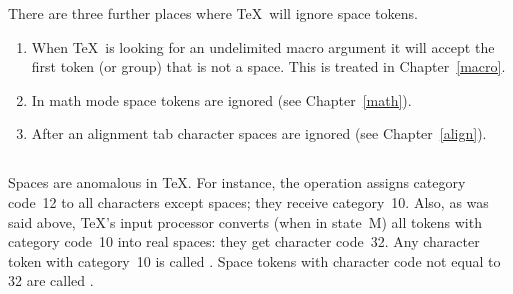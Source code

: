 \documentclass{book}
\begin{document}
There are three further places where \TeX\ will ignore space tokens.
\alt
\begin{enumerate}
\item When \TeX\ is looking for
an undelimited macro argument it will accept the
first token (or group) that is not a space. This is treated
in Chapter~\ref{macro}.

\item In math mode space tokens are ignored (see Chapter~\ref{math}).

\item After an alignment tab character spaces are ignored
(see Chapter~\ref{align}).
\end{enumerate}

\subsection{}

Spaces are anomalous in \TeX.
For instance, the  operation 
assigns category code~12 to all
characters except spaces; they receive category~10.
Also, as was said above, \TeX's input processor converts (when in
state~{\italic M}) all tokens with category code~10 into real spaces:
they get character code~32.
Any character token with category~10 is called
.
Space tokens with character
code not equal to 32 are called .
\end{document}
